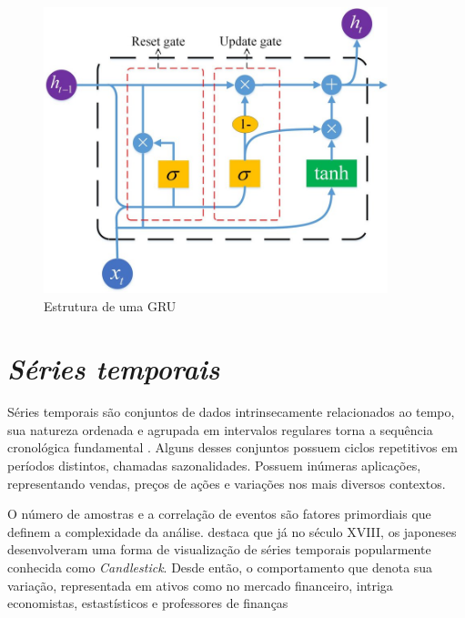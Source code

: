 \begin{figure}[!htb] \centering
  \caption{Estrutura de uma GRU} \label{figura:gru}
  \begin{varwidth}{\linewidth}
    \includegraphics[width=10cm]{figuras/gru.png}
  \end{varwidth}
\end{figure}

\section{\textit{Séries temporais}} \label{sec:temp}
Séries temporais são conjuntos de dados intrinsecamente relacionados ao tempo, sua natureza ordenada e agrupada em intervalos regulares
torna a sequência cronológica fundamental \cite{Esling}. Alguns desses conjuntos possuem ciclos repetitivos em períodos distintos, chamadas sazonalidades. 
Possuem inúmeras aplicações, representando vendas, preços de ações e variações nos mais diversos contextos.

O número de amostras e a correlação de eventos são fatores primordiais que definem a complexidade da análise.
\textcite{Nison} destaca que já no século XVIII, os japoneses desenvolveram uma forma de
visualização de séries temporais popularmente conhecida como \textit{Candlestick}.
Desde então, o comportamento que denota sua variação, representada em ativos como no mercado financeiro, intriga economistas, estastísticos e professores de finanças \cite{Fama}


